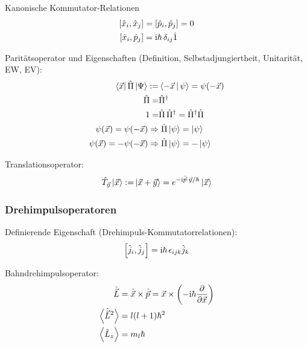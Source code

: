 \documentclass[11pt]{article}
\numberwithin{equation}{section}
\begin{document}
			\noindent
			Kanonische Kommutator-Relationen
			\begin{equation}
				\begin{aligned}
					\left[ \hat{x}_i, \hat{x}_j \right] &= \left[ \hat{p}_i, \hat{p}_j \right] = 0 \\
					\left[ \hat{x}_i, \hat{p}_j \right] &= \mathrm{i}\hbar\, \delta_{ij}\hat{1} \\
				\end{aligned}
			\end{equation}

			\noindent
			Paritätsoperator und Eigenschaften (Definition, Selbstadjungiertheit, Unitarität, EW, EV):
			\begin{equation}
				\begin{aligned}
					\Bra{\vec{x}} \hat{\Pi} \Ket{\Psi} :=& \Braket{-\vec{x} | \psi} = \psi(-\vec{x}) \\
					\hat{\Pi} =& \hat{\Pi}^\dagger\\
					1 =& \hat{\Pi} \,\hat{\Pi}^\dagger = \hat{\Pi}^\dagger \hat{\Pi} \\
					\psi(\vec{x}) = \psi(-\vec{x}) \Rightarrow&\; \hat{\Pi}\Ket{\psi} = \Ket{\psi} \\
					\psi(\vec{x}) = -\psi(-\vec{x}) \Rightarrow&\; \hat{\Pi}\Ket{\psi} = -\Ket{\psi} \\
				\end{aligned}
			\end{equation}

			\noindent
			Translationsoperator:
			\begin{equation}
				\begin{aligned}
					\hat{T}_{\vec{y}}\Ket{\vec{x}} :=& \Ket{\vec{x} + \vec{y}} = e^{-\mathrm{i}\hat{\vec{p}}\cdot\vec{y}/\hbar}\Ket{\vec{x}} \\
				\end{aligned}
			\end{equation}

		\subsubsection{Drehimpulsoperatoren}
			\noindent
			Definierende Eigenschaft (Drehimpuls-Kommutatorrelationen):
			\begin{equation}
				\left[ \hat{j}_i, \hat{j}_j \right] = \mathrm{i}\hbar\, \epsilon_{ijk} \hat{j}_k
			\end{equation}

			\noindent
			Bahndrehimpulsoperator:
			\begin{equation}
				\begin{aligned}
					\hat{\vec{L}} &= \hat{\vec{x}}\times \hat{\vec{p}} = \vec{x}\times\left(-\mathrm{i}\hbar\frac{\partial }{\partial \vec{x}}\right) \\
					\left< \hat{\vec{L}}^2 \right> &= l(l+1)\hbar^2 \\
					\left< \hat{L}_z \right> &= m_l \hbar \\
				\end{aligned}
			\end{equation}
\end{document}
